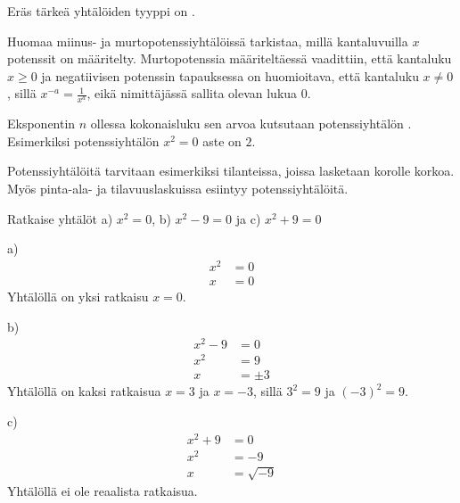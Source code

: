 Eräs tärkeä yhtälöiden tyyppi on .

Huomaa miinus- ja murtopotenssiyhtälöissä tarkistaa, millä kantaluvuilla $x$ potenssit on määritelty. Murtopotenssia määriteltäessä vaadittiin, että kantaluku $x\geq0$
ja negatiivisen potenssin tapauksessa on huomioitava, että kantaluku $x\neq0$, sillä $x^{-a}=\frac{1}{x^a}$, eikä nimittäjässä sallita olevan lukua $0$.

Eksponentin $n$ ollessa kokonaisluku sen arvoa kutsutaan potenssiyhtälön . Esimerkiksi potenssiyhtälön $x^2=0$ aste on $2$.

Potenssiyhtälöitä tarvitaan esimerkiksi tilanteissa, joissa lasketaan korolle korkoa.
Myös pinta-ala- ja tilavuuslaskuissa esiintyy potenssiyhtälöitä.


\begin{esimerkki}
Ratkaise yhtälöt a) $x^2 = 0$, b) $x^2 - 9 = 0$ ja c) $x^2 + 9 = 0$

a)	\begin{align*}
	x^2 &= 0 \\
	x &= 0
	\end{align*}
	Yhtälöllä on yksi ratkaisu $x = 0$.

b)	\begin{align*}
	x^2 - 9 &= 0 \\
	x^2 &= 9 \\
	x &= \pm 3
	\end{align*}
	Yhtälöllä on kaksi ratkaisua $x = 3$ ja $x = -3$, sillä $3^2 = 9$ ja $(-3)^2 = 9$.

c)	\begin{align*}
	x^2 + 9 &= 0 \\
	x^2 &= -9 \\
	x &= \sqrt{-9}
	\end{align*}
	Yhtälöllä ei ole reaalista ratkaisua.

\end{esimerkki}

